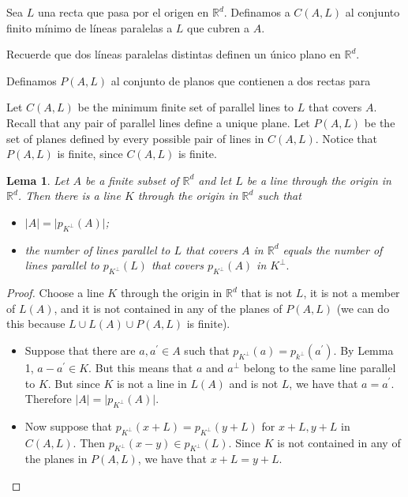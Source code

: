 \documentclass[12pt]{article}
\newcommand{\R}{\mathbb{R}}
\newtheorem{lemma}{Lema}
\begin{document}
Sea $L$ una recta que pasa por el origen en $\R^d$. Definamos a $C(A, L)$ al conjunto finito mínimo de líneas paralelas a $L$ que cubren a $A.$  

Recuerde que dos líneas paralelas distintas definen un único plano en $\R^d$. 

Definamos $P(A, L)$ al conjunto de planos que contienen a dos rectas para 

Let $C(A,L)$ be the minimum finite set of parallel lines to $L$ that covers $A$. Recall that any pair of parallel lines define a unique plane. Let $P(A, L)$ be the set of planes defined by every possible pair of lines in $C(A,L)$. Notice that $P(A, L)$ is finite, since $C(A,L)$ is finite. 

\begin{lemma}
    Let $A$ be a finite subset of $\R^d$ and let $L$ be a line through the origin in $\R^d$. Then there is a line $K$ through the origin in $\R^d$ such that
    \begin{itemize}
        \item[i)] $\lvert A \rvert  = \lvert p_{K^\perp}(A) \rvert$;
        \item[ii)] the number of lines parallel to $L$ that covers $A$ in $\R^d$ equals the number of lines parallel to $p_{K^\perp}(L)$ that covers $p_{K^\perp}(A)$ in $K^\perp.$
        
    \end{itemize}
\end{lemma}
\begin{proof}

Choose a line $K$ through the origin in $\R^d$ that is not $L$, it is not a member of $L(A)$, and it is not contained in any of the planes of $P(A,L)$  (we can do this because $L \cup L(A) \cup P(A,L)$ is finite). 
\begin{itemize}
\item[i)]  Suppose that there are $a, a^\prime \in A$ such that $p_{K^\perp}(a) = p_{k^\perp}(a^\prime).$ By Lemma 1, $a - a^\prime \in K.$ But this means that $a$ and $a^\perp$ belong to the same line parallel to $K$. But since $K$ is not a line in $L(A)$ and is not $L$, we have that $a = a^\prime.$ Therefore $\lvert A \rvert  = \lvert p_{K^\perp}(A) \rvert$.
\item[ii)] Now suppose that $p_{K^\perp}(x + L) = p_{K^\perp}( y + L)$ for $x + L, y + L$ in $C(A, L).$ Then $p_{K^\perp}(x-y) \in p_{K^\perp}(L)$. Since $K$ is not contained in any of the planes in $P(A, L)$, we have that $x + L = y + L.$ 
\end{itemize}
\end{proof}
\end{document}
